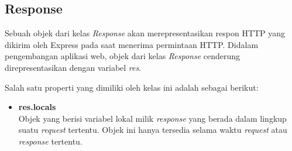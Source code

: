 \begin{itemize}
	
\end{itemize}

%
%	
%	

\subsection{Response}
Sebuah objek dari kelas \textit{Response} akan merepresentasikan respon HTTP yang dikirim oleh Express pada saat menerima permintaan HTTP. Didalam pengembangan aplikasi web, objek dari kelas \textit{Response} cenderung direpresentasikan dengan variabel \textit{res}.

Salah satu properti yang dimiliki oleh kelas ini adalah sebagai berikut:

\begin{itemize}
	\item \textbf{res.locals} \\
	Objek yang berisi variabel lokal milik \textit{response} yang berada dalam lingkup suatu \textit{request} tertentu. Objek ini hanya tersedia selama waktu \textit{request} atau \textit{response} tertentu.
\end{itemize}

